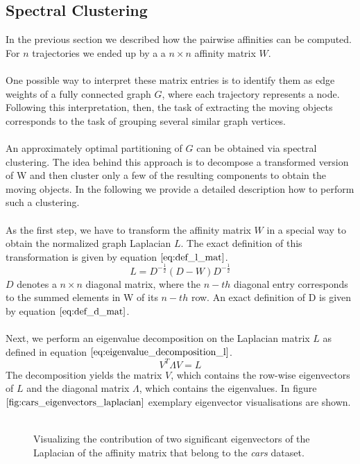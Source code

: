 \subsection{Spectral Clustering}
In the previous section we described how the pairwise affinities can be computed. For $n$ trajectories we ended up by a a $n \times n$ affinity matrix $W$. \\ \\ 
One possible way to interpret these matrix entries is to identify them as edge weights of a fully connected graph $G$, where each trajectory represents a node. Following this interpretation, then, the task of extracting the moving objects  corresponds to the task of grouping several similar graph vertices. \\ \\
An approximately optimal partitioning of $G$ can be obtained via spectral clustering. The idea behind this approach is to decompose a transformed version of W and then cluster only a few of the resulting components to obtain the moving objects. In the following we provide a detailed description how to perform such a clustering. \\ \\
As the first step, we have to transform the affinity matrix $W$ in a special way to obtain the normalized graph Laplacian $L$. The exact definition of this transformation is given by equation $\ref{eq:def_l_mat}$.
\begin{equation}
	L = D^{-\frac{1}{2}} \left( D - W \right) D^{-\frac{1}{2}}
\label{eq:def_l_mat}
\end{equation}
$D$ denotes a $n \times n$ diagonal matrix, where the $n-th$ diagonal entry corresponds to the summed elements in W of its $n-th$ row. An exact definition of D is given by equation $\ref{eq:def_d_mat}$. \\ \\
Next, we perform an eigenvalue decomposition on the Laplacian matrix $L$ as defined in equation $\ref{eq:eigenvalue_decomposition_l}$.
\begin{equation}
	V^{T} \Lambda V = L
\label{eq:eigenvalue_decomposition_l}
\end{equation}
The decomposition yields the matrix $V$, which contains the row-wise eigenvectors of $L$ and the diagonal matrix $\Lambda$, which contains the eigenvalues. In figure $\ref{fig:cars_eigenvectors_laplacian}$ exemplary eigenvector visualisations are shown.\\ \\
\begin{figure}[H]
\begin{center}
\end{center}
\caption[Eigenvectors of the Laplacian]{Visualizing the contribution of two significant eigenvectors of the Laplacian of the affinity matrix that belong to the \textit{cars} dataset.}
\label{fig:cars_eigenvectors_laplacian}
\end{figure}
